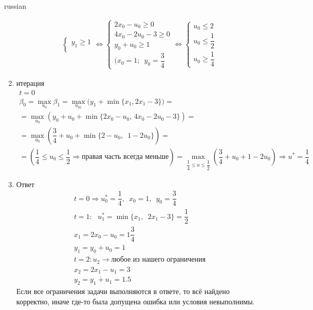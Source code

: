 \documentclass{article}
\begin{document}
\begin{otherlanguage*}{russian}
\begin{enumerate}
\begin{align*}
\begin{cases}
y_1 \ge 1 \\
\end{cases} \Leftrightarrow \begin{cases} 
2 x_0 - u_0 \ge 0 \\
4 x_0 - 2 u_0 - 3 \ge 0 \\
y_0 + u_0 \ge 1 \\
(x_0 = 1; \,\,\, y_0 = \dfrac{3}{4} 
\end{cases} \Leftrightarrow 
\begin{cases}
u_0 \le 2 \\
u_0 \le \dfrac{1}{2} \\
u_0 \ge \dfrac{1}{4}
\end{cases}
\end{align*}
\item итерация 
\begin{align*}
t =0 \\ 
\beta_0 = \max_{u_0} \beta_1 = \max_{u_01} \Big(y_1 + \min \{x_1, 2x_1 - 3  \} \Big) = \\ = \max_{u_0} (y_0 + u_0  + \min \{ 2x_0 - u_0 , \, 4x_0 - 2 u_0 - 3  \} ) = \\
= \max_{u_0} ( \dfrac{3}{4} + u_0 + \min \{ 2 - u_0 , \,\,\, 1 - 2 u_0 \} )  = \\
= ( \dfrac{1}{4} \le u_0 \le \dfrac{1}{2} \Rightarrow \text{правая часть всегда меньше} ) = \max_{\dfrac{1}{4} \le u \le \dfrac{1}{2}} ( \dfrac{3}{4} + u_0 + 1 - 2 u_0 ) \Rightarrow u^* = \dfrac{1}{4}
\end{align*}
\item Ответ
\begin{align*}
t = 0 \Rightarrow u^*_0 = \dfrac{1}{4} , \,\,\, x_0 = 1 , \,\,\, y_0 = \dfrac{3}{4} \\
t = 1: \,\,\,\, u_1 ^* = \min \{x_1, \,\,\, 2 x_1 - 3  \}  = \dfrac{1}{2}\\
x_1 = 2 x_0 - u_0 = 1 \dfrac{3}{4} \\
y_1 = y_0 + u_0 = 1 \\
t = 2 : u_2 \rightarrow \text{любое из нашего ограничения} \\
x_2 = 2 x_1 - u_1 = 3 \\
y_2 = y_1 + u_1 = 1.5 
\end{align*}
Если все ограничения задачи выполняются в ответе, то всё найдено корректно, иначе где-то была допущена ошибка или условия невыполнимы. 
\end{enumerate}

\end{otherlanguage*}
\end{document}
